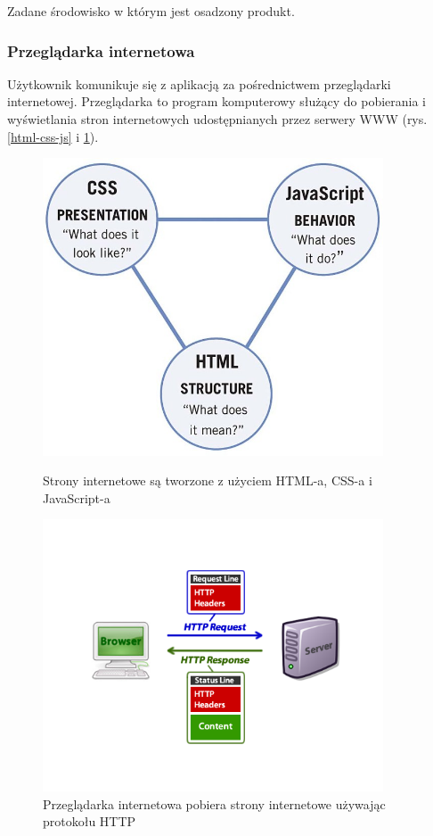 \documentclass[polish,12pt]{aghthesis}
\begin{document}
Zadane środowisko w którym jest osadzony produkt.

\subsubsection{Przeglądarka internetowa}
Użytkownik komunikuje się z aplikacją za pośrednictwem przeglądarki internetowej. Przeglądarka to program komputerowy służący do pobierania i wyświetlania stron internetowych udostępnianych przez serwery WWW (rys. \ref{html-css-js} i \ref{http_diagram}).

\begin{figure}[H]
    \centering
    \begin{minipage}{0.45\textwidth}
        \centering
        \includegraphics[width=0.9\textwidth]{html-css-js} %
        \caption{Strony internetowe są tworzone z użyciem HTML-a, CSS-a i JavaScript-a}
        \label{html-css-js}
    \end{minipage}\hfill
    \begin{minipage}{0.45\textwidth}
        \centering
        \includegraphics[width=0.9\textwidth]{http_diagram} %
        \caption{Przeglądarka internetowa pobiera strony internetowe używając protokołu HTTP}
        \label{http_diagram}
    \end{minipage}
\end{figure}
\end{document}
